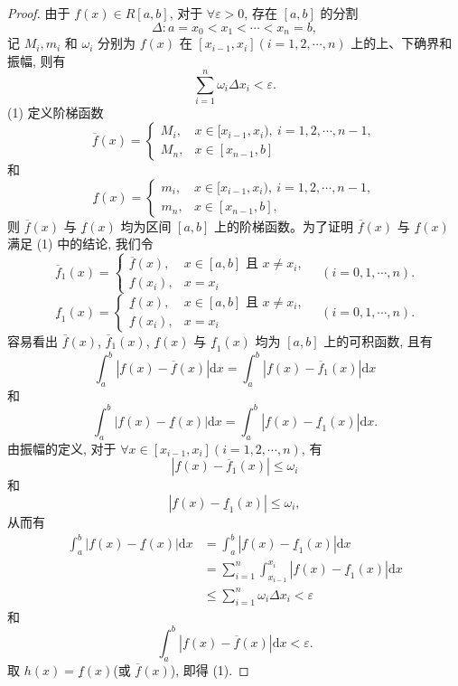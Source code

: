 \begin{proof}
由于 $f(x)\in R[a,b]$, 对于 $\forall\varepsilon>0$, 存在 $[a,b]$ 的分割
\[
  \Delta:a=x_0<x_1<\cdots<x_n=b,
\]
记 $M_i,m_i$ 和 $\omega_i$ 分别为 $f(x)$ 在 $[x_{i-1},x_i](i=1,2,\cdots,n)$ 上的上、下确界和振幅, 则有
\[
  \sum_{i=1}^n\omega_i\Delta x_i<\varepsilon.
\]
(1) 定义阶梯函数
\[
  \overline f(x)=
  \begin{cases}
    M_i, & x\in[x_{i-1},x_i),\ i=1,2,\cdots,n-1,\\
    M_n, & x\in[x_{n-1},b]
  \end{cases}
\]
和
\[
  \underline f(x)=
  \begin{cases}
    m_i, & x\in[x_{i-1},x_i),\ i=1,2,\cdots,n-1,\\
    m_n, & x\in[x_{n-1},b],
  \end{cases}
\]
则 $\overline f(x)$ 与 $\underline f(x)$ 均为区间 $[a,b]$ 上的阶梯函数。为了证明 $\overline f(x)$ 与 $\underline f(x)$ 满足 (1) 中的结论, 我们令
\[
  \overline f_1(x)=
  \begin{cases}
    \overline f(x), & x\in[a,b]\text{ 且 }x\neq x_i,\\
    f(x_i), & x=x_i
  \end{cases}
  \quad(i=0,1,\cdots,n).
\]
\[
  \underline f_1(x)=
  \begin{cases}
    \underline f(x), & x\in[a,b]\text{ 且 }x\neq x_i,\\
    f(x_i), & x=x_i
  \end{cases}
  \quad(i=0,1,\cdots,n).
\]
容易看出 $\overline f(x)$, $\overline f_1(x)$, $\underline f(x)$ 与 $\underline f_1(x)$ 均为 $[a,b]$ 上的可积函数, 且有
\[
  \int_a^b |f(x)-\overline f(x)|\mathrm dx
  =\int_a^b |f(x)-\overline f_1(x)|\mathrm dx
\]
和
\[
  \int_a^b |f(x)-\underline f(x)|\mathrm dx
  =\int_a^b |f(x)-\underline f_1(x)|\mathrm dx.
\]
由振幅的定义, 对于 $\forall x\in[x_{i-1},x_i](i=1,2,\cdots,n)$, 有
\begin{equation}
  |f(x)-\overline f_1(x)|\leq\omega_i
  \label{eq:ma-7-3-2}
\end{equation}
和
\begin{equation}
  |f(x)-\underline f_1(x)|\leq\omega_i,
  \label{eq:ma-7-3-3}
\end{equation}
从而有
\[
\begin{aligned}
  \int_a^b |f(x)-\underline f(x)|\mathrm dx
  &=\int_a^b |f(x)-\underline f_1(x)|\mathrm dx\\
  &=\sum_{i=1}^n\int_{x_{i-1}}^{x_i}|f(x)-\underline f_1(x)|\mathrm dx\\
  &\leq \sum_{i=1}^n\omega_i\Delta x_i<\varepsilon
\end{aligned}
\]
和
\[
  \int_a^b |f(x)-\overline f(x)|\mathrm dx<\varepsilon.
\]
取 $h(x)=\underline f(x)$(或 $\overline f(x)$), 即得 (1).


\end{proof}
